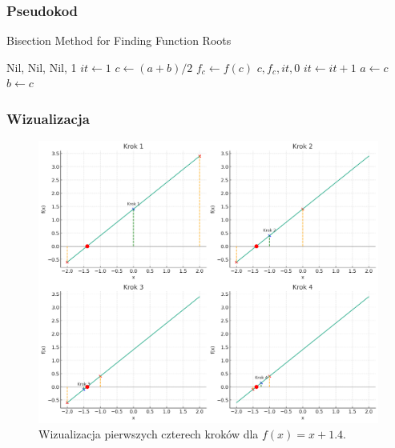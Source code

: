 \documentclass{article}
\begin{document}
\subsubsection*{Pseudokod}
\begin{algorithm}[H]
  \caption{Bisection Method for Finding Function Roots}
  \begin{algorithmic}[1]
          \State \Return Nil, Nil, Nil, 1
      \EndIf
      \State $it \gets 1$
          \State $c \gets (a + b) / 2$
          \State $f_c \gets f(c)$
              \State \Return $c, f_c, it, 0$
          \EndIf
          \State $it \gets it + 1$
              \State $a \gets c$
          \Else
              \State $b \gets c$
          \EndIf
      \EndWhile
  \EndProcedure
  \end{algorithmic}
  \end{algorithm}


\subsubsection*{Wizualizacja}
\begin{figure}[H]
  \centering
  \includegraphics[width=\textwidth]{./ex1.png}
  \caption{Wizualizacja pierwszych czterech kroków dla $f(x) = x + 1.4$.}
\end{figure}
\end{document}
